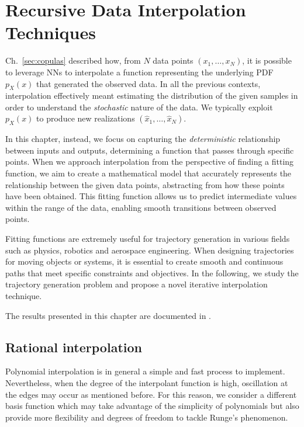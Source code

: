 \chapter{Recursive Data Interpolation Techniques} %
\label{sec:data interpolation}



Ch.~\ref{sec:copulas} described how, from $N$ data points $(x_1,\dots, x_N)$, it is possible to leverage NNs to interpolate a function representing the underlying PDF $p_X(x)$ that generated the observed data. In all the previous contexts, interpolation effectively meant estimating the distribution of the given samples in order to understand the \textit{stochastic} nature of the data. We typically exploit $p_X(x)$ to produce new realizations $(\hat{x}_1,\dots, \hat{x}_N)$.

In this chapter, instead, we focus on capturing the \textit{deterministic} relationship between inputs and outputs, determining a function that passes through specific points. 
When we approach interpolation from the perspective of finding a fitting function, we aim to create a mathematical model that accurately represents the relationship between the given data points, abstracting from how these points have been obtained. 
This fitting function allows us to predict intermediate values within the range of the data, enabling smooth transitions between observed points.

Fitting functions are extremely useful for trajectory generation in various fields such as physics, robotics and aerospace engineering. When designing trajectories for moving objects or systems, it is essential to create smooth and continuous paths that meet specific constraints and objectives.
In the following, we study the trajectory generation problem and propose a novel iterative interpolation technique.

The results presented in this chapter are documented in \cite{Letizia2020_rst, LetiziaRobotics, 9525383}.

\label{sec:rst}








\section{Rational interpolation} 
\label{sec:rst_rrst}
Polynomial interpolation is in general a simple and fast process to implement. Nevertheless, when the degree of the interpolant function is high, oscillation at the edges may occur as mentioned before. For this reason, we consider a different basis function which may take advantage of the simplicity of polynomials but also provide more flexibility and degrees of freedom to tackle Runge's phenomenon.

